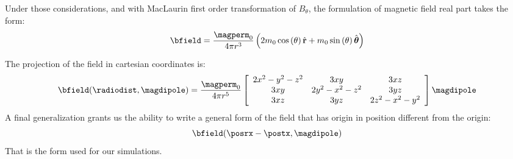 Under those considerations, and with MacLaurin first order transformation of $B_{\theta}$, the formulation of magnetic field real part takes the form:
\begin{equation}
\bfield = \dfrac{\magperm_0}{4 \pi r^3} \braces{ 2 m_0 \ccos{\theta} \vers{r} + m_0 \ssin{\theta} \vrtheta }
\label{eq:magneticfieldpolar}
\end{equation}

The projection of the field in cartesian coordinates is:
\begin{equation}
\bfield(\radiodist,\magdipole) = \dfrac{\magperm_0}{4 \pi r^5} \magfieldmatrix \magdipole
\end{equation}
A final generalization grants us the ability to write a general form of the field that has origin in position different from the origin:
\begin{equation}
\bfield(\posrx - \postx,\magdipole)
\end{equation}
That is the form used for our simulations.